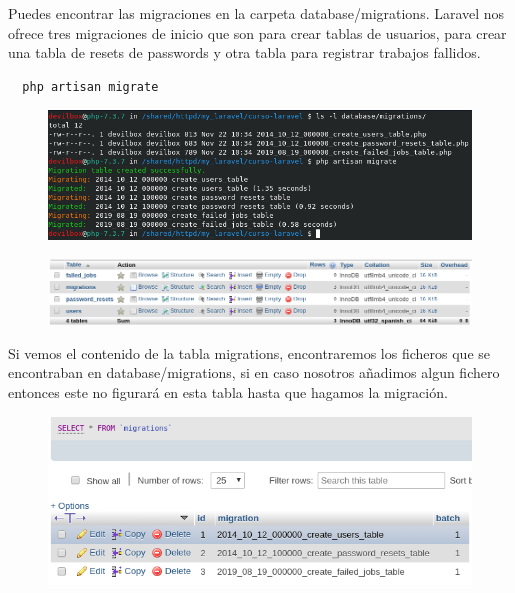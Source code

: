 \documentclass{article}
\begin{document}
Puedes encontrar las migraciones en la carpeta database/migrations. Laravel nos
ofrece tres migraciones de inicio que son para crear tablas de usuarios, para
crear una tabla de resets de passwords y otra tabla para registrar trabajos
fallidos.\\

\begin{verbatim}
  php artisan migrate
\end{verbatim}

\begin{figure}[h!]
  \centering
  \includegraphics[scale=0.75]{./Pictures/023_migrate.png}
\end{figure}

\begin{figure}[h!]
  \centering
  \includegraphics[scale=0.6]{./Pictures/024_migrate.png}
\end{figure}

Si vemos el contenido de la tabla migrations, encontraremos los ficheros que se
encontraban en database/migrations, si en caso nosotros añadimos algun fichero
entonces este no figurará en esta tabla hasta que hagamos la migración.\\

\begin{figure}[h!]
  \centering
  \includegraphics[scale=0.6]{./Pictures/025_table_migrations.png}
\end{figure}
\end{document}
